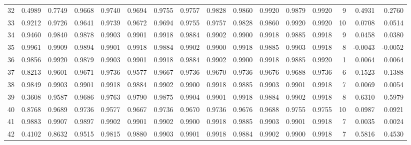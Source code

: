 \begin{tabular}{lrrrrrrrrrrrrrrr}
32  &      0.4989 &  0.7749 &  0.9668 &  0.9740 &  0.9694 &  0.9755 &  0.9757 &  0.9828 &  0.9860 &  0.9920 &   0.9879 &     0.9920 &      9 &                    0.4931 &                     0.2760 \\
33  &      0.9212 &  0.9726 &  0.9641 &  0.9739 &  0.9672 &  0.9694 &  0.9755 &  0.9757 &  0.9828 &  0.9860 &   0.9920 &     0.9920 &     10 &                    0.0708 &                     0.0514 \\
34  &      0.9460 &  0.9840 &  0.9878 &  0.9903 &  0.9901 &  0.9918 &  0.9884 &  0.9902 &  0.9900 &  0.9918 &   0.9885 &     0.9918 &      9 &                    0.0458 &                     0.0380 \\
35  &      0.9961 &  0.9909 &  0.9894 &  0.9901 &  0.9918 &  0.9884 &  0.9902 &  0.9900 &  0.9918 &  0.9885 &   0.9903 &     0.9918 &      8 &                   -0.0043 &                    -0.0052 \\
36  &      0.9856 &  0.9920 &  0.9879 &  0.9903 &  0.9901 &  0.9918 &  0.9884 &  0.9902 &  0.9900 &  0.9918 &   0.9885 &     0.9920 &      1 &                    0.0064 &                     0.0064 \\
37  &      0.8213 &  0.9601 &  0.9671 &  0.9736 &  0.9577 &  0.9667 &  0.9736 &  0.9670 &  0.9736 &  0.9676 &   0.9688 &     0.9736 &      6 &                    0.1523 &                     0.1388 \\
38  &      0.9849 &  0.9903 &  0.9901 &  0.9918 &  0.9884 &  0.9902 &  0.9900 &  0.9918 &  0.9885 &  0.9903 &   0.9901 &     0.9918 &      7 &                    0.0069 &                     0.0054 \\
39  &      0.3608 &  0.9587 &  0.9686 &  0.9763 &  0.9790 &  0.9875 &  0.9904 &  0.9901 &  0.9918 &  0.9884 &   0.9902 &     0.9918 &      8 &                    0.6310 &                     0.5979 \\
40  &      0.8768 &  0.9689 &  0.9736 &  0.9577 &  0.9667 &  0.9736 &  0.9670 &  0.9736 &  0.9676 &  0.9688 &   0.9755 &     0.9755 &     10 &                    0.0987 &                     0.0921 \\
41  &      0.9883 &  0.9907 &  0.9897 &  0.9902 &  0.9901 &  0.9902 &  0.9900 &  0.9918 &  0.9885 &  0.9903 &   0.9901 &     0.9918 &      7 &                    0.0035 &                     0.0024 \\
42  &      0.4102 &  0.8632 &  0.9515 &  0.9815 &  0.9880 &  0.9903 &  0.9901 &  0.9918 &  0.9884 &  0.9902 &   0.9900 &     0.9918 &      7 &                    0.5816 &                     0.4530 \\

\end{tabular}
